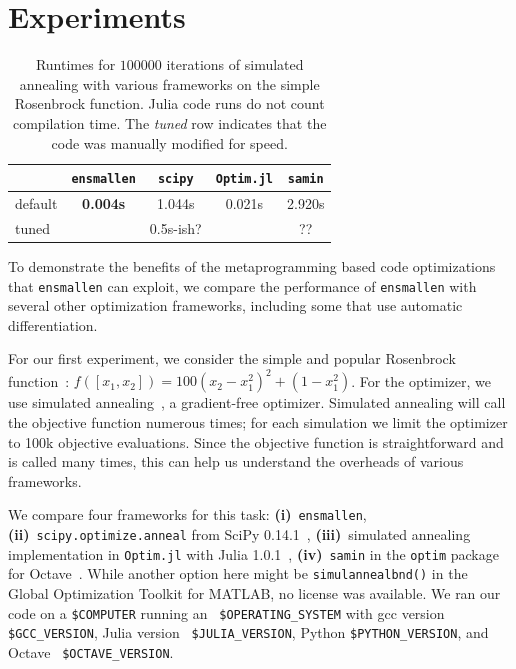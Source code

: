 \documentclass{article}
\begin{document}
\section{Experiments}
\vspace*{-0.5em}

\begin{table}[t]
\begin{center}
\begin{tabular}{lcccc}
\toprule
 & {\tt ensmallen} & {\tt scipy} & {\tt Optim.jl} & {\tt samin} \\
\midrule
default & {\bf 0.004s} & 1.044s & 0.021s & 2.920s \\
tuned & & 0.5s-ish? & & ?? \\ %
\bottomrule
\end{tabular}
\end{center}
\caption{Runtimes for $100000$ iterations of simulated annealing with various
frameworks on the simple Rosenbrock function.  Julia code runs do not count
compilation time.  The {\it tuned} row indicates that the code was manually
modified for speed.}
\label{tab:rosenbrock_results}
\end{table}

To demonstrate the benefits of the metaprogramming based code optimizations
that {\tt ensmallen} can exploit,
we compare the performance of {\tt ensmallen} with several other
optimization frameworks, including some that use automatic differentiation.

For our first experiment, we consider the simple and popular Rosenbrock
function~\cite{Rosenbrock1960}: $f([x_1, x_2]) = 100 (x_2 - x_1^2)^2 + (1 -
x_1^2)$.  For the optimizer, we use simulated
annealing~\cite{kirkpatrick1983optimization}, a gradient-free optimizer.
Simulated annealing will call the objective function numerous times; for each
simulation we limit the optimizer to 100k objective evaluations.  Since the
objective function is straightforward and is called many times, this can help us
understand the overheads of various frameworks.

We compare four frameworks for this task:
{\bf (i)}~{\tt ensmallen},
{\bf (ii)}~\texttt{\small scipy.optimize.anneal} from SciPy 0.14.1~\cite{jones2014scipy},
{\bf (iii)}~simulated annealing implementation in \texttt{\small Optim.jl} with Julia 1.0.1~\cite{mogensen2018optim},
{\bf (iv)}~\texttt{\small samin} in the \texttt{\small optim} package for Octave~\cite{octave}.
While another option here might be \texttt{\small simulannealbnd()} 
in the Global Optimization Toolkit for MATLAB,
no license was available.
We ran our code on a {\tt \$COMPUTER} running an {\tt
\$OPERATING\_SYSTEM} with gcc version {\tt \$GCC\_VERSION}, Julia version {\tt
\$JULIA\_VERSION}, Python {\tt \$PYTHON\_VERSION}, and Octave {\tt
\$OCTAVE\_VERSION}.
\end{document}
